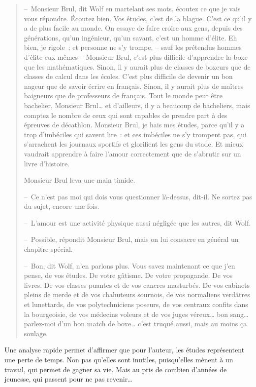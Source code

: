 {\small
\begin{quotation}
– Monsieur Brul, dit Wolf en martelant ses mots, écoutez ce que je vais vous répondre. Écoutez bien. Vos études, c’est de la blague. C’est ce qu’il y a de plus facile au monde. On essaye de faire croire aux gens, depuis des générations, qu’un ingénieur, qu’un savant, c’est un homme d’élite. Eh bien, je rigole ; et personne ne s’y trompe, – sauf les prétendus hommes d’élite eux-mêmes – Monsieur Brul, c’est plus difficile d’apprendre la boxe que les mathématiques. Sinon, il y aurait plus de classes de boxeurs que de classes de calcul dans les écoles. C’est plus difficile de devenir un bon nageur que de savoir écrire en français. Sinon, il y aurait plus de maîtres baigneurs que de professeurs de français. Tout le monde peut être bachelier, Monsieur Brul… et d’ailleurs, il y a beaucoup de bacheliers, mais comptez le nombre de ceux qui sont capables de prendre part à des épreuves de décathlon. Monsieur Brul, je hais mes études, parce qu’il y a trop d’imbéciles qui savent lire : et ces imbéciles ne s’y trompent pas, qui s’arrachent les journaux sportifs et glorifient les gens du stade. Et mieux vaudrait apprendre à faire l’amour correctement que de s’abrutir sur un livre d’histoire.

Monsieur Brul leva une main timide.

– Ce n’est pas moi qui dois vous questionner là-dessus, dit-il. Ne sortez pas du sujet, encore une fois.

– L’amour est une activité physique aussi négligée que les autres, dit Wolf.

– Possible, répondit Monsieur Brul, mais on lui consacre en général un chapitre spécial.

– Bon, dit Wolf, n’en parlons plus. Vous savez maintenant ce que j’en pense, de vos études. De votre gâtisme. De votre propagande. De vos livres. De vos classes puantes et de vos cancres masturbés. De vos cabinets pleins de merde et de vos chahuteurs sournois, de vos normaliens verdâtres et lunettards, de vos polytechniciens poseurs, de vos centraux confits dans la bourgeoisie, de vos médecins voleurs et de vos juges véreux… bon sang… parlez-moi d’un bon match de boxe… c’est truqué aussi, mais au moins ça soulage.
\end{quotation}
}

Une analyse rapide permet d'affirmer que pour l'auteur, les études représentent
une perte de temps. Non pas qu'elles sont inutiles, puisqu'elles mènent à un
travail, qui permet de gagner sa vie. Mais au pris de combien d'années de jeunesse,
qui passent pour ne pas revenir\ldots

